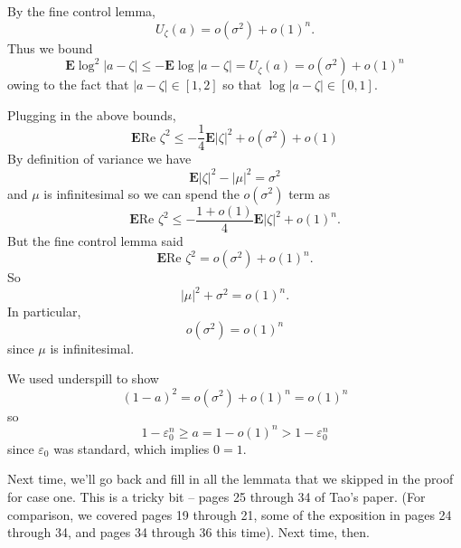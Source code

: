\documentclass[12pt]{article}
\begin{document}
By the fine control lemma,
$$U_\zeta(a) = o(\sigma^2) + o(1)^n.$$
Thus we bound
$$\mathbf E \log^2 |a - \zeta| \leq -\mathbf E \log |a - \zeta| = U_\zeta(a) = o(\sigma^2) + o(1)^n$$
owing to the fact that $|a - \zeta| \in [1, 2]$ so that $\log |a - \zeta| \in [0, 1]$.

Plugging in the above bounds,
$$\mathbf E \text{Re }\zeta^2 \leq -\frac{1}{4} \mathbf E|\zeta|^2 + o(\sigma^2) + o(1)$$
By definition of variance we have
$$\mathbf E |\zeta|^2 - |\mu|^2 = \sigma^2$$
and $\mu$ is infinitesimal so we can spend the $o(\sigma^2)$ term as
$$\mathbf E\text{Re }\zeta^2 \leq -\frac{1+o(1)}{4} \mathbf E |\zeta|^2 + o(1)^n.$$
But the fine control lemma said $$\mathbf E\text{Re }\zeta^2 = o(\sigma^2) + o(1)^n.$$
So
$$|\mu|^2 + \sigma^2 = o(1)^n.$$
In particular,
$$o(\sigma^2) = o(1)^n$$
since $\mu$ is infinitesimal.

We used underspill to show
$$(1 - a)^2 = o(\sigma^2) + o(1)^n = o(1)^n$$
so
$$1 - \varepsilon_0^n \geq a = 1 - o(1)^n > 1 - \varepsilon_0^n$$
since $\varepsilon_0$ was standard, which implies $0 = 1$.

Next time, we'll go back and fill in all the lemmata that we skipped in the proof for case one.
This is a tricky bit -- pages 25 through 34 of Tao's paper. (For comparison, we covered pages 19 through 21, some of the exposition in pages 24 through 34, and pages 34 through 36 this time). Next time, then.
\end{document}
